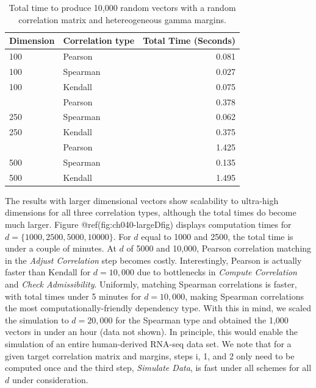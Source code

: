 \documentclass[
]{jss}
\begin{document}
\begin{CodeChunk}
\begin{table}

\caption{\label{tab:tab:ch040-moderateDtab}Total time to produce 10,000 random vectors with a random correlation matrix and hetereogeneous gamma margins.}
\centering
\begin{tabular}[t]{llr}
\toprule
Dimension & Correlation type & Total Time (Seconds)\\
\midrule
100 & Pearson & 0.081\\
100 & Spearman & 0.027\\
100 & Kendall & 0.075\\
\addlinespace
250 & Pearson & 0.378\\
250 & Spearman & 0.062\\
250 & Kendall & 0.375\\
\addlinespace
500 & Pearson & 1.425\\
500 & Spearman & 0.135\\
500 & Kendall & 1.495\\
\bottomrule
\end{tabular}
\end{table}

\end{CodeChunk}

The results with larger dimensional vectors show scalability to
ultra-high dimensions for all three correlation types, although the
total times do become much larger. Figure @ref(fig:ch040-largeDfig)
displays computation times for \(d=\{1000, 2500, 5000, 10000\}\). For
\(d\) equal to 1000 and 2500, the total time is under a couple of
minutes. At \(d\) of 5000 and 10,000, Pearson correlation matching in
the \emph{Adjust Correlation} step becomes costly. Interestingly,
Pearson is actually faster than Kendall for \(d=10,000\) due to
bottlenecks in \emph{Compute Correlation} and \emph{Check
Admissibility}. Uniformly, matching Spearman correlations is faster,
with total times under 5 minutes for \(d=10,000\), making Spearman
correlations the most computationally-friendly dependency type. With
this in mind, we scaled the simulation to \(d=20,000\) for the Spearman
type and obtained the 1,000 vectors in under an hour (data not shown).
In principle, this would enable the simulation of an entire
human-derived RNA-seq data set. We note that for a given target
correlation matrix and margins, steps i, 1, and 2 only need to be
computed once and the third step, \emph{Simulate Data}, is fast under
all schemes for all \(d\) under consideration.
\end{document}
